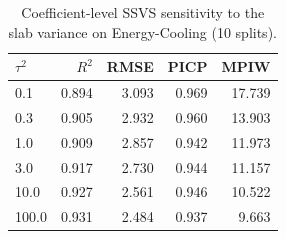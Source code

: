 \begin{table}[htbp]
\centering
\caption{Coefficient-level SSVS sensitivity to the slab variance on Energy-Cooling (10 splits).}
\label{tab:tau2}
\scriptsize
\begin{tabular}{lrrrr}
\toprule
$\tau^2$ & $R^2$ & RMSE & PICP & MPIW \\
\midrule
0.1 & 0.894 & 3.093 & 0.969 & 17.739 \\
0.3 & 0.905 & 2.932 & 0.960 & 13.903 \\
1.0 & 0.909 & 2.857 & 0.942 & 11.973 \\
3.0 & 0.917 & 2.730 & 0.944 & 11.157 \\
10.0 & 0.927 & 2.561 & 0.946 & 10.522 \\
100.0 & 0.931 & 2.484 & 0.937 & 9.663 \\
\bottomrule
\end{tabular}
\end{table}
